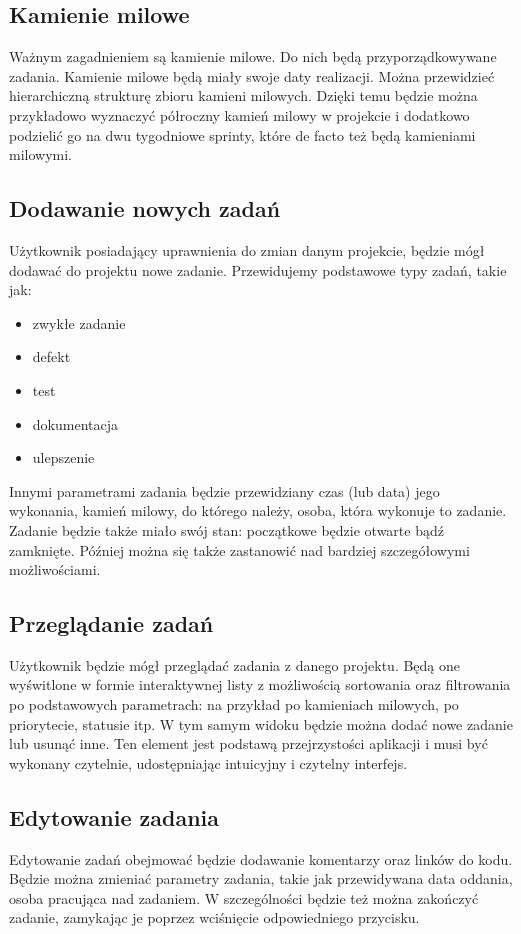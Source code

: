 \documentclass[a4paper,12pt,notitlepage]{mwrep}
\begin{document}
\subsection{Kamienie milowe}
Ważnym zagadnieniem są kamienie milowe. Do nich będą przyporządkowywane zadania.
Kamienie milowe będą miały swoje daty realizacji. Można przewidzieć hierarchiczną
strukturę zbioru kamieni milowych. Dzięki temu będzie można przykładowo wyznaczyć
półroczny kamień milowy w projekcie i dodatkowo podzielić go na dwu tygodniowe
sprinty, które de facto też będą kamieniami milowymi.

\subsection{Dodawanie nowych zadań}
Użytkownik posiadający uprawnienia do zmian danym projekcie,
będzie mógł dodawać do projektu nowe zadanie. Przewidujemy podstawowe typy zadań, takie jak: 
\begin{itemize}
	\item	zwykłe zadanie
	\item	defekt
	\item	test
	\item	dokumentacja
	\item	ulepszenie
\end{itemize}
Innymi parametrami zadania będzie przewidziany czas (lub data) jego wykonania,
kamień milowy, do którego należy, osoba, która wykonuje to zadanie.
Zadanie będzie także miało swój stan: początkowe będzie otwarte bądź zamknięte.
Później można się także zastanowić nad bardziej szczegółowymi możliwościami.

\subsection{Przeglądanie zadań}
Użytkownik będzie mógł przeglądać zadania z danego projektu.
Będą one wyświtlone w formie interaktywnej listy z możliwością sortowania
oraz filtrowania po podstawowych parametrach: na przykład po kamieniach milowych,
po priorytecie, statusie itp. W tym samym widoku będzie można dodać nowe zadanie
lub usunąć inne. Ten element jest podstawą przejrzystości aplikacji i musi
być wykonany czytelnie, udostępniając intuicyjny i czytelny interfejs.

\subsection{Edytowanie zadania}
Edytowanie zadań obejmować będzie dodawanie komentarzy oraz linków do kodu.
Będzie można zmieniać parametry zadania, takie jak przewidywana data oddania,
osoba pracująca nad zadaniem. W szczególności będzie też można zakończyć zadanie,
zamykając je poprzez wciśnięcie odpowiedniego przycisku.
\end{document}
